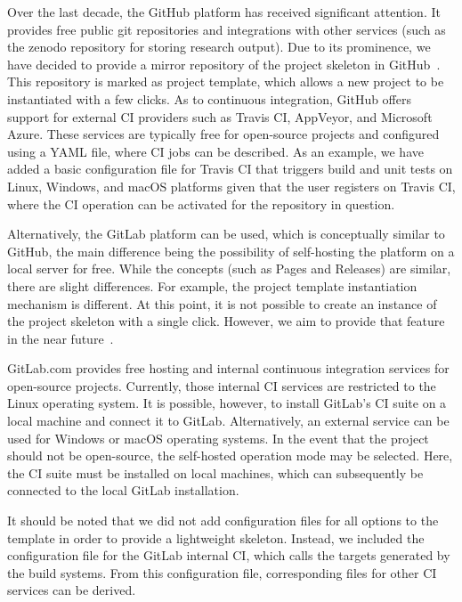 \documentclass[@CLASSOPTIONS@]{tumarticle}
\begin{document}
Over the last decade, the GitHub platform has received significant attention.
It provides free public git repositories and integrations with other services
(such as the zenodo repository for storing research output). Due to its
prominence, we have decided to provide a mirror repository of the project
skeleton in GitHub~\cite{bertha-github}.
This repository is marked as project template, which allows a new project to
be instantiated with a few clicks. As to continuous integration, GitHub
offers support for external CI providers such as Travis CI, AppVeyor, and
Microsoft Azure. These services are typically free for open-source projects
and configured using a YAML file, where CI jobs can be described. As an
example, we have added a basic configuration file for Travis CI that triggers
build and unit tests on Linux, Windows, and macOS platforms given that the
user registers on Travis CI, where the CI operation can be activated for the
repository in question.

Alternatively, the GitLab platform can be used, which is conceptually similar
to GitHub, the main difference being the possibility of self-hosting the
platform on a local server for free. While the concepts (such as Pages and
Releases) are similar, there are slight differences. For example, the project
template instantiation mechanism is different. At this point, it is not
possible to create an instance of the project skeleton with a single click.
However, we aim to provide that feature in the near future~\cite{bertha-mr}.

GitLab.com provides free hosting and internal continuous integration services
for open-source projects. Currently, those internal CI services are restricted
to the Linux operating system. It is possible, however, to install GitLab's
CI suite on a local machine and connect it to GitLab. Alternatively, an
external service can be used for Windows or macOS operating systems. In the
event that the project should not be open-source, the self-hosted operation
mode may be selected. Here, the CI suite must be installed on local machines,
which can subsequently be connected to the local GitLab installation.

It should be noted that we did not add configuration files for all options to
the template in order to provide a lightweight skeleton. Instead, we included
the configuration file for the GitLab internal CI, which calls the targets
generated by the build systems. From this configuration file, corresponding
files for other CI services can be derived.
\end{document}
